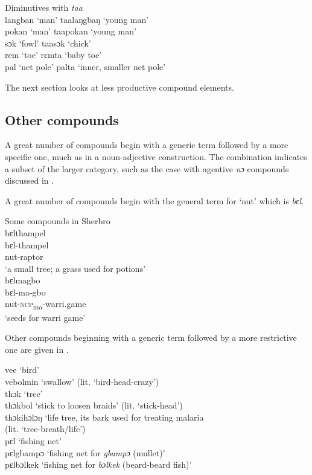 \ea%
    \label{ex:185}Diminutives with \textit{taa}\\
    
    langban ‘man' \tab taalaŋgbaŋ \tab ‘young man'\\
    pokan \tab ‘man' \tab taapokan \tab \tab ‘young man'\\
    sɔk \tab ‘fowl' \tab taasɔk \tab \tab ‘chick'\\
    rem \tab ‘toe' \tab rɛmta \tab \tab ‘baby toe'\\
    pal \tab ‘net pole' \tab palta \tab \tab ‘inner, smaller net pole'\\
    \z

The next section looks at less productive compound elements.

\subsection{Other compounds}
\label{sec:7.3.3}\hypertarget{Toc115517810}{}
A great number of compounds begin with a generic term followed by a more specific one, much as in a noun-adjective construction. The combination indicates a subset of the larger category, such as the case with agentive \textit{nɔ} compounds discussed in .

A great number of compounds begin with the general term for ‘nut' which is \textit{bɛl}.

\ea%
    \label{ex:186}
    Some compounds in Sherbro\\
    \ea
    bɛlthampel\\
    \gll bɛl-thampel\\
    nut-raptor\\
    \glt ‘a small tree; a grass used for potions'\\

    \ex  bɛlmagbo\\
    \gll bɛl-ma-gbo\\
    nut-\textsc{ncp}\textsubscript{ma}{}-warri.game\\
    \glt ‘seeds for warri game'
\z
\z

\noindent Other compounds beginning with a generic term followed by a more restrictive one are given in .

\TabPositions{2cm,6cm,7cm,8cm}
\ea%
    \label{ex:187}
    \ea vee  \tab  ‘bird'\\
        vebolmin \tab ‘swallow' (lit. ‘bird-head-crazy')\footnotemark\\
    \ex thɔk \tab ‘tree'\\
        thɔkbol \tab ‘stick to loosen braids' (lit. ‘stick-head')\\
        thɔkihɔlɔŋ \tab ‘life tree, its bark used for treating malaria\\ 
        \tab (lit. ‘tree-breath/life')\\
    \ex pɛl \tab ‘fishing  net'\\
        pɛlgbampɔ \tab ‘fishing net for \textit{gbampɔ} (mullet)'\\
        pɛlbɔlkek \tab ‘fishing net for \textit{bɔlkek} (beard-beard fish)'
    \z
\z

